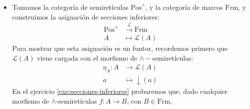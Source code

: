 \documentclass[12pt,letterpaper,titlepage]{article}
\theoremstyle{definition}
\newcommand\down{{\downarrow}}
\renewcommand\inf{\wedge}
\renewcommand\cal[1]{\mathcal{#1}}
\newcommand\<{\langle}
\renewcommand\>{\rangle}
\newcommand{\Frm}{\mathrm{Frm}}
\newcommand{\Pos}{\mathrm{Pos}}
\begin{document}
\begin{itemize}
    \item
    Tomamos la categoría de semiretículas $\Pos^{\inf}$, y la categoría de marcos $\Frm$, y construimos la asignación de secciones inferiores:
    \begin{align*}
        \Pos^{\inf} & \overset{\mathcal{L}}{\to} \Frm \\
        A & \mapsto \mathcal{L}(A)
    \end{align*}
    Para mostrar que esta asignación es un funtor,
    recordemos primero que $\cal L(A)$ viene cargada
    con el morfismo de $\inf-$semiretículas:
    \begin{align*}
        \eta_A: A & \to \mathcal{L}(A) \\
            a & \mapsto \down(a)
    \end{align*}
    En el ejercicio \ref{exe:secciones-inferiores}
    probaremos que, dado cualquier morfismo de $\inf$-semiretículas
    $f:A\to B$, con $B\in\Frm$,

\end{itemize}
\end{document}
